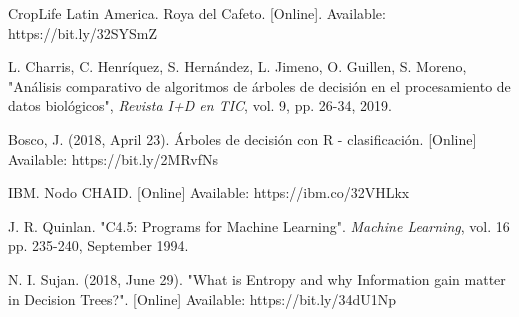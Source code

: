 \documentclass{acm_proc_article-sp}
\begin{document}
\begin{thebibliography}{6}

CropLife Latin America. Roya del Cafeto. [Online]. Available: https://bit.ly/32SYSmZ

L. Charris, C. Henríquez, S. Hernández, L. Jimeno, O. Guillen, S. Moreno,
"Análisis comparativo de algoritmos de árboles de decisión en el procesamiento de datos biológicos", \textit{Revista I+D en TIC}, vol. 9, pp. 26-34, 2019.

Bosco, J. (2018, April 23). Árboles de decisión con R - clasificación. [Online] Available: https://bit.ly/2MRvfNs

IBM. Nodo CHAID. [Online] Available: https://ibm.co/32VHLkx

J. R. Quinlan. "C4.5: Programs for Machine Learning". \textit{Machine Learning}, vol. 16 pp. 235-240, September 1994.

N. I. Sujan. (2018, June 29). "What is Entropy and why Information gain matter in Decision Trees?". [Online] Available: https://bit.ly/34dU1Np

\end{thebibliography}

\balancecolumns
\end{document}
